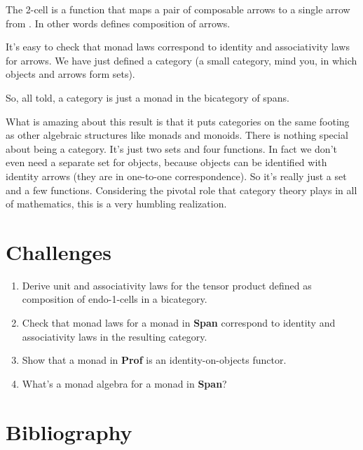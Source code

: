The 2-cell  is a function that maps a pair of composable
arrows  to a single arrow  from
. In other words  defines composition of arrows.

It's easy to check that monad laws correspond to identity and
associativity laws for arrows. We have just defined a category (a small
category, mind you, in which objects and arrows form sets).

So, all told, a category is just a monad in the bicategory of spans.

What is amazing about this result is that it puts categories on the same
footing as other algebraic structures like monads and monoids. There is
nothing special about being a category. It's just two sets and four
functions. In fact we don't even need a separate set for objects,
because objects can be identified with identity arrows (they are in
one-to-one correspondence). So it's really just a set and a few
functions. Considering the pivotal role that category theory plays in
all of mathematics, this is a very humbling realization.

\section{Challenges}\label{challenges}

\begin{enumerate}
\tightlist
\item
  Derive unit and associativity laws for the tensor product defined as
  composition of endo-1-cells in a bicategory.
\item
  Check that monad laws for a monad in \textbf{Span} correspond to
  identity and associativity laws in the resulting category.
\item
  Show that a monad in \textbf{Prof} is an identity-on-objects functor.
\item
  What's a monad algebra for a monad in \textbf{Span}?
\end{enumerate}

\section{Bibliography}\label{bibliography}
